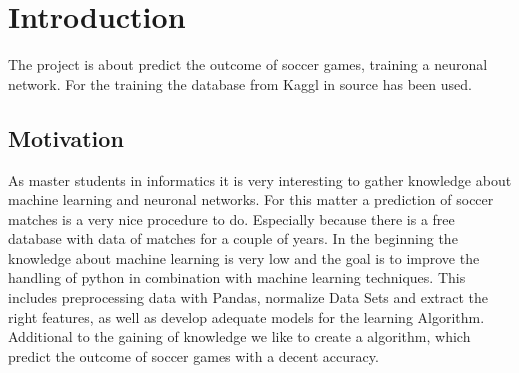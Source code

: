 
\chapter{Introduction}

The project is about predict the outcome of soccer games, training a neuronal network. For the training the database from Kaggl in source \cite{kggl:2019} has been used. 


\section{Motivation}
As master students in informatics it is very interesting to gather knowledge about machine learning and neuronal networks. For this matter a prediction of soccer matches is a very nice procedure to do. Especially because there is a free database with data of matches for a couple of years. In the beginning the knowledge about machine learning is very low and the goal is to improve the handling of python in combination with machine learning techniques. This includes preprocessing data with Pandas, normalize Data Sets and extract the right features, as well as develop adequate models for the learning Algorithm. Additional to the gaining of knowledge we like to create a algorithm, which predict the outcome of soccer games with a decent accuracy.
